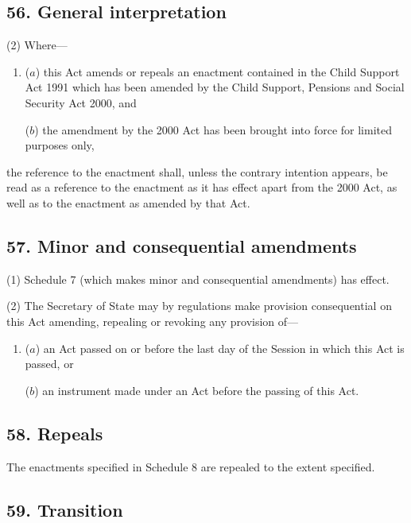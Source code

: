 \documentclass[12pt,a4paper]{article}
\begin{document}
\subsection{56. General interpretation}


(2) Where—
\begin{enumerate}\item[]
($a$) this Act amends or repeals an enactment contained in the Child Support Act 1991 which has been amended by the Child Support, Pensions and Social Security Act 2000, and

($b$) the amendment by the 2000 Act has been brought into force for limited purposes only,
\end{enumerate}
the reference to the enactment shall, unless the contrary intention appears, be read as a reference to the enactment as it has effect apart from the 2000 Act, as well as to the enactment as amended by that Act.


\subsection{57. Minor and consequential amendments}

(1) Schedule 7 (which makes minor and consequential amendments) has effect.

(2) The Secretary of State may by regulations make provision consequential on this Act amending, repealing or revoking any provision of—
\begin{enumerate}\item[]
($a$) an Act passed on or before the last day of the Session in which this Act is passed, or

($b$) an instrument made under an Act before the passing of this Act.
\end{enumerate}

\subsection{58. Repeals}

The enactments specified in Schedule 8 are repealed to the extent specified.

\subsection{59. Transition}
\end{document}
